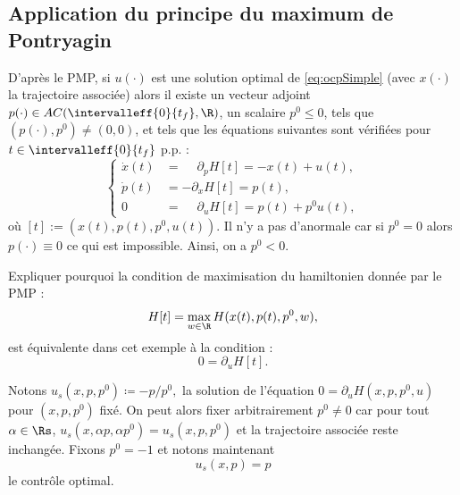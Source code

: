 \subsection{Application du principe du maximum de Pontryagin}

    D'apr\`es le PMP, si $u(\cdot)$ est une solution optimal de \eqref{eq:ocpSimple} (avec $x(\cdot)$ la trajectoire associ\'ee)
    alors il existe un vecteur adjoint $p(\cdot) \in AC(\intervalleff{0}{t_f},\R)$, un scalaire $p^0 \le 0$, tels que $(p(\cdot),p^0) \ne (0,0)$,
    et tels que les \'equations suivantes sont v\'erifi\'ees pour $t\in\intervalleff{0}{t_f}$ p.p. :
    \begin{equation*}
        \left\{ 
            \begin{array}{ll}
                \dot{x}(t)  & = \phantom{-} \partial_p H[t] = -x(t)+u(t),   \\[0.5em]
                \dot{p}(t)  & = -           \partial_x H[t] = p(t),         \\[0.5em]
                0           & = \phantom{-} \partial_u H[t] = p(t)+p^0 u(t),
            \end{array}
        \right. 
    \end{equation*}
    o\`u $[t] := (x(t),p(t),p^0,u(t))$.
    Il n'y a pas d'anormale car si $p^0=0$ alors $p(\cdot)\equiv0$ ce qui est impossible. Ainsi, on a $p^0 < 0$.

    \begin{myQuestion}
        \label{question:hamiltonien}
            Expliquer pourquoi la condition de maximisation du hamiltonien donn\'ee par le PMP :
            \begin{equation*}
                H[t] = \max_{w\in\R} H(x(t),p(t),p^0,w),
            \end{equation*}
            est \'equivalente dans cet exemple \`a la condition :
            \begin{equation*}
                0 = \partial_u H[t].
            \end{equation*}
    \end{myQuestion}

    Notons 
    $
        u_s(x,p,p^0) \coloneqq - p/p^0,
    $
    la solution de l'\'equation $0 = \partial_u H(x,p,p^0,u)$ pour $(x,p,p^0)$ fix\'e.
    On peut alors fixer arbitrairement $p^0\ne 0$ car pour tout $\alpha \in \Rs$, $u_s(x,\alpha p, \alpha p^0) = u_s(x,p,p^0)$ et la trajectoire
    associ\'ee reste inchang\'ee. Fixons $p^0 = -1$ et notons maintenant
    \begin{equation}
        u_s(x,p) = p
        \label{eq:controleOCPSimple}
    \end{equation}
    le contr\^ole optimal.

